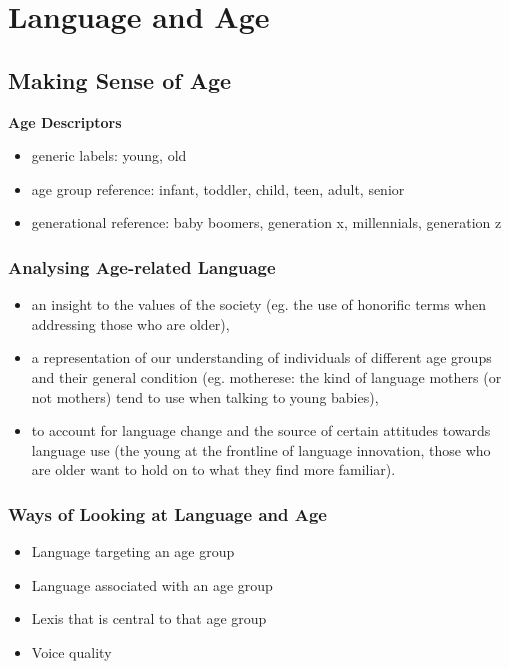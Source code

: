 \documentclass[../main.tex]{subfiles}
\begin{document}
\chapter{Language and Age}

\section{Making Sense of Age}
\textbf{Age Descriptors} \begin{itemize}
	\item generic labels: young, old
	\item age group reference: infant, toddler, child, teen, adult, senior
	\item generational reference: baby boomers, generation x, millennials, generation z
\end{itemize}

\subsection{Analysing Age-related Language}
\begin{itemize}
	\item an insight to the values of the society (eg. the use of honorific terms when addressing those who are older),
	\item a representation of our understanding of individuals of different age groups and their general condition (eg. motherese: the kind of language mothers (or not mothers) tend to use when talking to young babies),
	\item to account for language change and the source of certain attitudes towards language use (the young at the frontline of language innovation, those who are older want to hold on to what they find more familiar). 
\end{itemize}

\subsection{Ways of Looking at Language and Age}
\begin{itemize}
	\item Language targeting an age group
	\item Language associated with an age group
	\item Lexis that is central to that age group
	\item Voice quality
\end{itemize}
\end{document}
